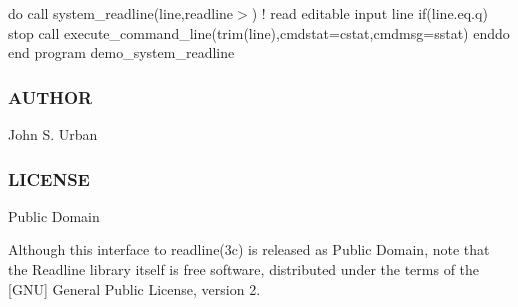 do call system\+\_\+readline(line,\textquotesingle{}readline$>$\textquotesingle{}) ! read editable input line if(line.\+eq.\textquotesingle{}q\textquotesingle{}) stop call execute\+\_\+command\+\_\+line(trim(line),cmdstat=cstat,cmdmsg=sstat) enddo end program demo\+\_\+system\+\_\+readline \subsubsection*{A\+U\+T\+H\+OR}

John S. Urban \subsubsection*{L\+I\+C\+E\+N\+SE}

Public Domain

Although this interface to readline(3c) is released as Public Domain, note that the Readline library itself is free software, distributed under the terms of the \mbox{[}G\+NU\mbox{]} General Public License, version 2. 